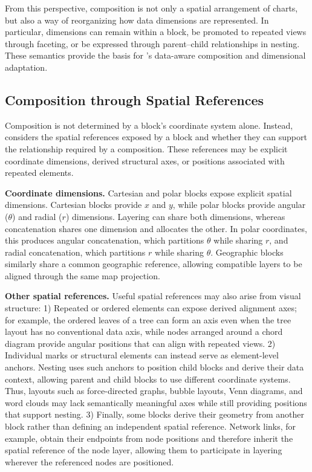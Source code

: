 From this perspective, composition is not only a spatial arrangement of
charts, but also a way of reorganizing how data dimensions are represented.
In particular, dimensions can remain within a block, be promoted to repeated
views through faceting, or be expressed through parent--child relationships
in nesting. These semantics provide the basis for {\system}'s data-aware
composition and dimensional adaptation.


\subsection{Composition through Spatial References}

Composition is not determined by a block's coordinate system alone. Instead,
{\system} considers the spatial references exposed by a block and whether they
can support the relationship required by a composition. These references may
be explicit coordinate dimensions, derived structural axes, or positions
associated with repeated elements.

\textbf{Coordinate dimensions.}
Cartesian and polar blocks expose explicit spatial dimensions. Cartesian
blocks provide $x$ and $y$, while polar blocks provide angular ($\theta$) and
radial ($r$) dimensions. Layering can share both dimensions, whereas
concatenation shares one dimension and allocates the other. In polar
coordinates, this produces angular concatenation, which partitions $\theta$
while sharing $r$, and radial concatenation, which partitions $r$ while
sharing $\theta$. Geographic blocks similarly share a common geographic
reference, allowing compatible layers to be aligned through the same map
projection.

\textbf{Other spatial references.}
Useful spatial references may also arise from visual structure:
1) Repeated or ordered elements can expose derived
alignment axes; for example, the ordered leaves of a tree can form an axis even
when the tree layout has no conventional data axis, while nodes arranged around
a chord diagram provide angular positions that can align with repeated views.
2) Individual marks or structural elements can instead serve as element-level
anchors. Nesting uses such anchors to position child blocks and derive their
data context, allowing parent and child blocks to use different coordinate
systems. Thus, layouts such as force-directed graphs, bubble layouts, Venn
diagrams, and word clouds may lack semantically meaningful axes while still
providing positions that support nesting. 3) Finally, some blocks derive their
geometry from another block rather than defining an independent spatial
reference. Network links, for example, obtain their endpoints from node
positions and therefore inherit the spatial reference of the node layer,
allowing them to participate in layering wherever the referenced nodes are
positioned.

